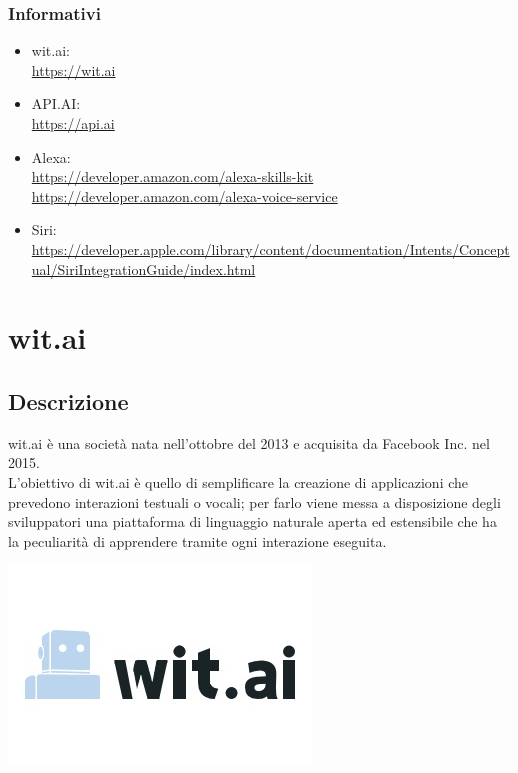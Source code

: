 \documentclass[a4paper,titlepage]{article}
\begin{document}
		\subsubsection{Informativi}
			\begin{itemize}
				\item wit.ai: \\
				\url{https://wit.ai}
				\item API.AI: \\
				\url{https://api.ai}
				\item Alexa: \\
				\url{https://developer.amazon.com/alexa-skills-kit} \\
				\url{https://developer.amazon.com/alexa-voice-service}
				\item Siri: \\
				\url{https://developer.apple.com/library/content/documentation/Intents/Conceptual/SiriIntegrationGuide/index.html}
			\end{itemize}
\newpage
\section{wit.ai}
	\subsection{Descrizione}
		\begin{minipage}{0.7\textwidth}\raggedright
			wit.ai è una società nata nell'ottobre del 2013 e acquisita da Facebook Inc. nel 2015. \\
			L'obiettivo di wit.ai è quello di semplificare la creazione di applicazioni che prevedono interazioni testuali o vocali; per farlo viene messa a disposizione degli sviluppatori una piattaforma di linguaggio naturale aperta ed estensibile che ha la peculiarità di apprendere tramite ogni interazione eseguita.
		\end{minipage}
		\hfill
		\noindent\begin{minipage}{0.15\textwidth}
		\includegraphics[scale=0.6]{images/witai.jpg}
		\end{minipage}
\end{document}
